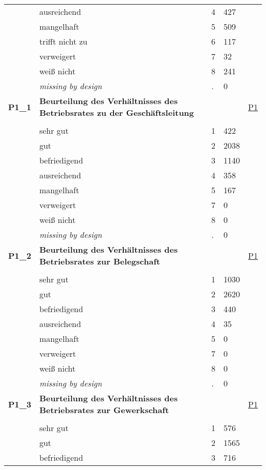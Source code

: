 \begin{longtable}{| L{2.65cm} | L{8cm} | C{1.5cm} | R{1.25cm} | C{2.25cm}  |}
   & ausreichend & 4 & 427 &  \\ 
   & mangelhaft & 5 & 509 &  \\ 
   & trifft nicht zu & 6 & 117 &  \\ 
   & verweigert & 7 & 32 &  \\ 
   & weiß nicht & 8 & 241 &  \\ 
   & \textit{missing by design} & \textit{.} & 0 &  \\ 
   \midrule
\textbf{P1\_1}\label{var:P1:1} & \textbf{Beurteilung des Verhältnisses des Betriebsrates zu der Geschäftsleitung} &  &  & \hyperref[P1]{P1} \\ 
   &  &  &  &  \\ 
   & sehr gut & 1 & 422 &  \\ 
   & gut & 2 & 2038 &  \\ 
   & befriedigend & 3 & 1140 &  \\ 
   & ausreichend & 4 & 358 &  \\ 
   & mangelhaft & 5 & 167 &  \\ 
   & verweigert & 7 & 0 &  \\ 
   & weiß nicht & 8 & 0 &  \\ 
   & \textit{missing by design} & \textit{.} & 0 &  \\ 
   \midrule
\textbf{P1\_2}\label{var:P1:2} & \textbf{Beurteilung des Verhältnisses des Betriebsrates zur Belegschaft} &  &  & \hyperref[P1]{P1} \\ 
   &  &  &  &  \\ 
   & sehr gut & 1 & 1030 &  \\ 
   & gut & 2 & 2620 &  \\ 
   & befriedigend & 3 & 440 &  \\ 
   & ausreichend & 4 & 35 &  \\ 
   & mangelhaft & 5 & 0 &  \\ 
   & verweigert & 7 & 0 &  \\ 
   & weiß nicht & 8 & 0 &  \\ 
   & \textit{missing by design} & \textit{.} & 0 &  \\ 
   \midrule
\textbf{P1\_3}\label{var:P1:3} & \textbf{Beurteilung des Verhältnisses des Betriebsrates zur Gewerkschaft} &  &  & \hyperref[P1]{P1} \\ 
   &  &  &  &  \\ 
   & sehr gut & 1 & 576 &  \\ 
   & gut & 2 & 1565 &  \\ 
   & befriedigend & 3 & 716 &  \\ 

\end{longtable}
